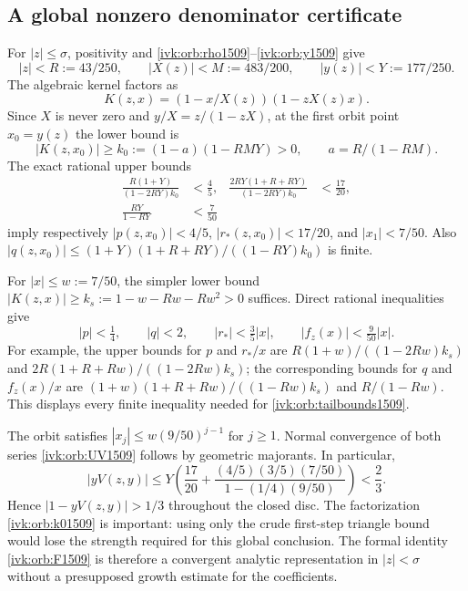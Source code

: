 \documentclass[11pt,letterpaper]{article}
\theoremstyle{remark}\newtheorem{remark}[theorem]{Remark}
\begin{document}
\subsection{A global nonzero denominator certificate}
For $|z|\le\sigma$, positivity and \eqref{ivk:orb:rho1509}--\eqref{ivk:orb:y1509} give
\[
|z|<R:=43/250,\qquad |X(z)|<M:=483/200,\qquad
|y(z)|<Y:=177/250.
\]
The algebraic kernel factors as
\[
K(z,x)=(1-x/X(z))(1-zX(z)x).
\]
Since $X$ is never zero and $y/X=z/(1-zX)$, at the first orbit point
$x_0=y(z)$ the lower bound is
\begin{equation}\label{ivk:orb:k01509}
|K(z,x_0)|\ge k_0:=(1-a)(1-RMY)>0,\qquad
 a=R/(1-RM).
\end{equation}
The exact rational upper bounds
\begin{equation}\label{ivk:orb:first1509}
\begin{aligned}
\frac{R(1+Y)}{(1-2RY)k_0}&<\frac45,&
\frac{2RY(1+R+RY)}{(1-2RY)k_0}&<\frac{17}{20},\\
\frac{RY}{1-RY}&<\frac7{50}
\end{aligned}
\end{equation}
imply respectively $|p(z,x_0)|<4/5$, $|r_*(z,x_0)|<17/20$,
and $|x_1|<7/50$. Also
$|q(z,x_0)|\le(1+Y)(1+R+RY)/((1-RY)k_0)$ is finite.

For $|x|\le w:=7/50$, the simpler lower bound
$|K(z,x)|\ge k_s:=1-w-Rw-Rw^2>0$ suffices. Direct rational
inequalities give
\begin{equation}\label{ivk:orb:tailbounds1509}
|p|<\tfrac14,\qquad |q|<2,\qquad
|r_*|<\tfrac35|x|,\qquad |f_z(x)|<\tfrac9{50}|x|.
\end{equation}
For example, the upper bounds for $p$ and $r_*/x$ are
$R(1+w)/((1-2Rw)k_s)$ and
$2R(1+R+Rw)/((1-2Rw)k_s)$; the corresponding bounds for $q$ and
$f_z(x)/x$ are $(1+w)(1+R+Rw)/((1-Rw)k_s)$ and $R/(1-Rw)$.
This displays every finite inequality needed for \eqref{ivk:orb:tailbounds1509}.

The orbit satisfies $|x_j|\le w(9/50)^{j-1}$ for $j\ge1$.
Normal convergence of both series \eqref{ivk:orb:UV1509} follows by geometric
majorants. In particular,
\begin{equation}\label{ivk:orb:denom1509}
|yV(z,y)|\le Y\left(\frac{17}{20}
+\frac{(4/5)(3/5)(7/50)}{1-(1/4)(9/50)}\right)<\frac23.
\end{equation}
Hence $|1-yV(z,y)|>1/3$ throughout the closed disc. The factorization
\eqref{ivk:orb:k01509} is important: using only the crude first-step triangle
bound would lose the strength required for this global conclusion.
The formal identity \eqref{ivk:orb:F1509} is therefore a convergent analytic
representation in $|z|<\sigma$ without a presupposed growth estimate
for the coefficients.
\end{document}
